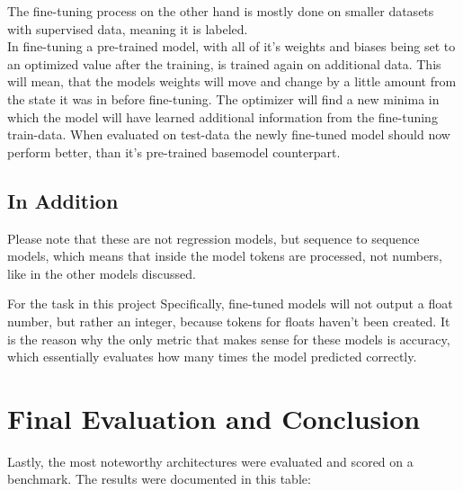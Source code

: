 \documentclass{article}
\begin{document}
The fine-tuning process on the other hand is mostly done on smaller datasets 
with supervised data, meaning it is labeled.
\\[2em]
In fine-tuning a pre-trained model, with all of it's weights and biases being 
set to an optimized value after the training, is trained again on additional 
data. This will mean, that the models weights will move and change by a little 
amount from the state it was in before fine-tuning. The optimizer will find a 
new minima in which the model will have learned additional information from the 
fine-tuning train-data. When evaluated on test-data the newly fine-tuned model 
should now perform better, than it's pre-trained basemodel counterpart.

\subsection{In Addition}
Please note that these are not regression models, but sequence to sequence 
models, which means that inside the model tokens are processed, not numbers, 
like in the other models discussed. 

For the task in this project Specifically, fine-tuned models will not output a 
float number, but rather an integer, because tokens for floats haven't been 
created. It is the reason why the only metric that makes sense for these models 
is accuracy, which essentially evaluates how many times the model predicted 
correctly.

\newpage

\section{Final Evaluation and Conclusion}

Lastly, the most noteworthy architectures were evaluated and scored on a 
benchmark. The results were documented in this table: 
\\[0.5em]
\end{document}
